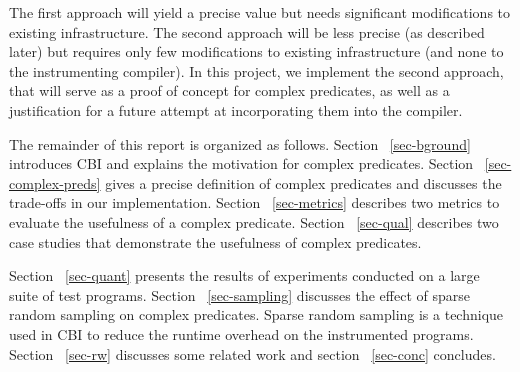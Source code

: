 The first approach will yield a precise value but needs significant modifications to existing infrastructure.  The second approach will be less precise (as described later) but requires only few modifications to existing infrastructure (and none to the instrumenting compiler).  In this project, we implement the second approach, that will serve as a proof of concept for complex predicates, as well as a justification for a future attempt at incorporating them into the compiler.

The remainder of this report is organized as follows.  Section ~\ref{sec-bground} introduces CBI and explains the motivation for complex predicates.  Section ~\ref{sec-complex-preds} gives a precise definition of complex predicates and discusses the trade-offs in our implementation.  Section ~\ref{sec-metrics} describes two metrics to evaluate the usefulness of a complex predicate.  Section ~\ref{sec-qual} describes two case studies that demonstrate the usefulness of complex predicates.  

Section ~\ref{sec-quant} presents the results of experiments conducted on a large suite of test programs.  Section ~\ref{sec-sampling} discusses the effect of sparse random sampling on complex predicates.  Sparse random sampling is a technique used in CBI to reduce the runtime overhead on the instrumented programs.  Section ~\ref{sec-rw} discusses some related work and section ~\ref{sec-conc} concludes.
